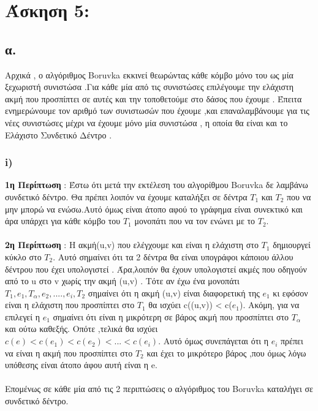 \documentclass[12pt,a4paper]{article}
\begin{document}
\section*{Άσκηση 5: }
\subsection*{α.}

\par Αρχικά , ο αλγόριθμος Boruvka εκκινεί θεωρώντας κάθε κόμβο μόνο του ως μία ξεχωριστή συνιστώσα .Για κάθε μία από τις συνιστώσες επιλέγουμε την ελάχιστη ακμή που προσπίπτει σε αυτές και την τοποθετούμε στο δάσος που έχουμε . Έπειτα ενημερώνουμε τον αριθμό των συνιστωσών που έχουμε ,και επαναλαμβάνουμε για τις νέες συνιστώσες μέχρι να έχουμε μόνο μία συνιστώσα , η οποία θα είναι και το Ελάχιστο Συνδετικό Δέντρο .

\subsubsection*{i)}

\par \textbf{1η Περίπτωση} : Έστω ότι μετά την εκτέλεση του αλγορίθμου Boruvka δε λαμβάνω συνδετικό δέντρο. Θα πρέπει λοιπόν να έχουμε καταλήξει σε δέντρα $Τ_1$ και $T_2$ που να μην μπορώ να ενώσω.Αυτό όμως είναι άτοπο αφού το γράφημα είναι συνεκτικό και άρα υπάρχει για κάθε κόμβο του $Τ_1$ μονοπάτι που να τον ενώνει με το $Τ_2$.\\\\
\textbf{2η Περίπτωση} : Η ακμή(u,v) που ελέγχουμε και είναι η ελάχιστη στο $Τ_1$  δημιουργεί κύκλο στο $Τ_2$. Αυτό σημαίνει ότι τα 2 δέντρα θα είναι υπογράφοι κάποιου άλλου δέντρου που έχει υπολογιστεί . Άρα,λοιπόν θα έχουν υπολογιστεί ακμές που οδηγούν από το u στο v χωρίς την ακμή (u,v) . Τότε αν έχω ένα μονοπάτι $T_1,e_1,Τ_α,e_2,....,e_i,T_2$ σημαίνει ότι η ακμή (u,v) είναι διαφορετική της $e_1$ κι εφόσον είναι η ελάχιστη που προσπίπτει στο $Τ_1$ θα ισχύει c((u,v)) < c($e_1$). Ακόμη, για να επιλεγεί η $e_1$ σημαίνει ότι είναι η μικρότερη σε βάρος ακμή που προσπίπτει στο $Τ_α$ και ούτω καθεξής. Οπότε ,τελικά θα ισχύει $c(e)<c(e_1)<c(e_2)<...<c(e_i)$. Αυτό όμως συνεπάγεται ότι η $e_i$ πρέπει να είναι η ακμή που προσπίπτει στο $Τ_2$ και έχει το μικρότερο βάρος ,που όμως λόγω υπόθεσης είναι άτοπο άφου αυτή είναι η e. \\\\
Επομένως σε κάθε μία από τις 2 περιπτώσεις ο αλγόριθμος του Boruvka καταλήγει σε συνδετικό δέντρο.
\end{document}
